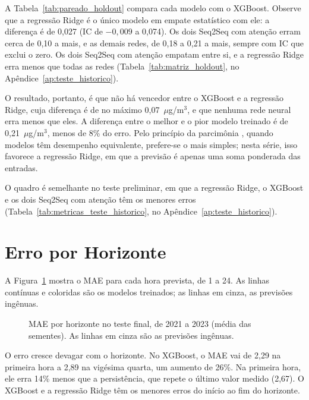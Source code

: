 A Tabela~\ref{tab:pareado_holdout} compara cada modelo com o XGBoost. Observe que a regressão Ridge é o único modelo em empate estatístico com ele: a diferença é de 0,027 (IC de \(-0{,}009\) a 0,074). Os dois Seq2Seq com atenção erram cerca de 0,10 a mais, e as demais redes, de 0,18 a 0,21 a mais, sempre com IC que exclui o zero. Os dois Seq2Seq com atenção empatam entre si, e a regressão Ridge erra menos que todas as redes (Tabela~\ref{tab:matriz_holdout}, no Apêndice~\ref{ap:teste_historico}).


O resultado, portanto, é que não há vencedor entre o XGBoost e a regressão Ridge, cuja diferença é de no máximo 0,07~\(\mu\)g/m\(^3\), e que nenhuma rede neural erra menos que eles. A diferença entre o melhor e o pior modelo treinado é de 0,21~\(\mu\)g/m\(^3\), menos de 8\% do erro. Pelo princípio da parcimônia \cite{box1976time}, quando modelos têm desempenho equivalente, prefere-se o mais simples; nesta série, isso favorece a regressão Ridge, em que a previsão é apenas uma soma ponderada das entradas.

O quadro é semelhante no teste preliminar, em que a regressão Ridge, o XGBoost e os dois Seq2Seq com atenção têm os menores erros (Tabela~\ref{tab:metricas_teste_historico}, no Apêndice~\ref{ap:teste_historico}).

\section{Erro por Horizonte}
\label{sec:erro_horizonte}

A Figura~\ref{fig:erro_por_horizonte_holdout} mostra o MAE para cada hora prevista, de 1 a 24. As linhas contínuas e coloridas são os modelos treinados; as linhas em cinza, as previsões ingênuas.

\begin{figure}[!htbp]
    \centering
    \caption[MAE por horizonte no teste final]{MAE por horizonte no teste final, de 2021 a 2023 (média das sementes). As linhas em cinza são as previsões ingênuas.}
    \label{fig:erro_por_horizonte_holdout}
\end{figure}

O erro cresce devagar com o horizonte. No XGBoost, o MAE vai de 2,29 na primeira hora a 2,89 na vigésima quarta, um aumento de 26\%. Na primeira hora, ele erra 14\% menos que a persistência, que repete o último valor medido (2,67). O XGBoost e a regressão Ridge têm os menores erros do início ao fim do horizonte.

